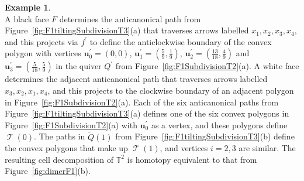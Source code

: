 \documentclass[11pt,a4paper]{amsart}
\numberwithin{equation}{section}
\theoremstyle{definition}
\newtheorem{example}[theorem]{Example}
\theoremstyle{remark}
\newcommand{\tile}{\operatorname{\mathcal{T}}}
\begin{document}
\begin{example}
\[ \]
 A black face $F$ determines the anticanonical path from Figure~\ref{fig:F1tiltingSubdivisionT3}(a) that traverses arrows labelled $x_1, x_2, x_3, x_4$, and this projects via $f^\prime$ to define the anticlockwise boundary of the convex polygon with vertices $\mathbf{u}^\prime_0=(0,0)$, $\mathbf{u}_1^\prime=(\frac{5}{9},\frac{1}{9})$, $\mathbf{u}^\prime_2=(\frac{13}{18},\frac{4}{9})$ and $\mathbf{u}^\prime_3=(\frac{5}{18},\frac{5}{9})$ in the quiver $Q^\prime$ from Figure~\ref{fig:F1SubdivisionT2}(a). A white face determines the adjacent anticanonical path that traverses arrows labelled $x_3, x_2, x_1, x_4$, and this projects to the clockwise boundary of an adjacent polygon in Figure~\ref{fig:F1SubdivisionT2}(a). Each of the six anticanonical paths from Figure~\ref{fig:F1tiltingSubdivisionT3}(a) defines one of the six convex polygons in  Figure~\ref{fig:F1SubdivisionT2}(a) with $\mathbf{u}^\prime_0$ as a vertex, and these polygons define $\tile(0)$. The paths in $\widetilde{Q}(1)$ from Figure~\ref{fig:F1tiltingSubdivisionT3}(b) define the convex polygons that make up $\tile(1)$, and vertices $i=2,3$ are similar. The resulting cell decomposition of $\mathbb{T}^2$ is homotopy equivalent to that from Figure~\ref{fig:dimerF1}(b). 
\end{example}
\end{document}
